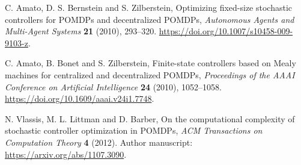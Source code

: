 C. Amato, D. S. Bernstein and S. Zilberstein,
Optimizing fixed-size stochastic controllers for POMDPs and decentralized
POMDPs, \emph{Autonomous Agents and Multi-Agent Systems} \textbf{21}
(2010), 293--320. \url{https://doi.org/10.1007/s10458-009-9103-z}.

C. Amato, B. Bonet and S. Zilberstein,
Finite-state controllers based on Mealy machines for centralized and
decentralized POMDPs, \emph{Proceedings of the AAAI Conference on Artificial
Intelligence} \textbf{24} (2010), 1052--1058.
\url{https://doi.org/10.1609/aaai.v24i1.7748}.

N. Vlassis, M. L. Littman and D. Barber,
On the computational complexity of stochastic controller optimization in
POMDPs, \emph{ACM Transactions on Computation Theory} \textbf{4} (2012).
Author manuscript: \url{https://arxiv.org/abs/1107.3090}.
